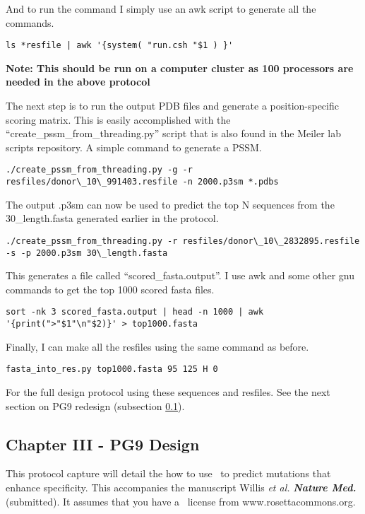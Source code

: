And to run the command I simply use an awk script to generate all the commands.

\begin{lstlisting}[breaklines=true]
ls *resfile | awk '{system( "run.csh "$1 ) }'
\end{lstlisting}

\textbf{Note: This should be run on a computer cluster as 100 processors are needed in the above protocol}

The next step is to run the output PDB files and generate a position-specific scoring matrix. This is easily accomplished with the ``create\_pssm\_from\_threading.py'' script that is also found in the Meiler lab scripts repository. A simple command to generate a PSSM.

\begin{lstlisting}[breaklines=true]
./create_pssm_from_threading.py -g -r resfiles/donor\_10\_991403.resfile -n 2000.p3sm *.pdbs
\end{lstlisting}

The output .p3sm can now be used to predict the top N sequences from the 30\_length.fasta generated earlier in the protocol.

\begin{lstlisting}[breaklines=true]
./create_pssm_from_threading.py -r resfiles/donor\_10\_2832895.resfile -s -p 2000.p3sm 30\_length.fasta
\end{lstlisting}

This generates a file called ``scored\_fasta.output''. I use awk and some other gnu commands to get the top 1000 scored fasta files.

\begin{lstlisting}[breaklines=true]
sort -nk 3 scored_fasta.output | head -n 1000 | awk '{print(">"$1"\n"$2)}' > top1000.fasta
\end{lstlisting}

Finally, I can make all the resfiles using the same command as before.

\begin{lstlisting}[breaklines=true]
fasta_into_res.py top1000.fasta 95 125 H 0
\end{lstlisting}

For the full design protocol using these sequences and resfiles. See the next section on PG9 redesign (subsection \ref{subsec:pg9redesign}).

\subsection{Chapter III - PG9 Design}
\label{subsec:pg9redesign}
\setlength{\parindent}{0cm}
This protocol capture will detail the how to use \rosettadesign~to predict mutations that enhance specificity. This accompanies the manuscript Willis \textit{et al.} \textbf{\textit{Nature Med.}} (submitted). It assumes that you have a \rosetta~license from www.rosettacommons.org. \\

